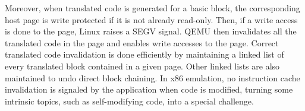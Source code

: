 \documentclass[11pt,twoside]{article}
\begin{document}
  Moreover,
  when translated code is generated for a basic block,
  the corresponding host page is write protected
  if it is not already read-only. Then, if a write access is done 
  to the page, Linux raises a SEGV signal. QEMU then invalidates
  all the translated code in the page and enables write accesses
  to the page.
  Correct translated code invalidation is done efficiently by
  maintaining a linked list of every translated block contained in
  a given page. Other linked lists are also maintained to 
  undo direct block chaining.
  In x86 emulation, no  instruction cache invalidation is signaled by
  the application when code is modified, turning 
  some intrinsic topics, %
  such as self-modifying code,
  into a special challenge.

\end{document}
